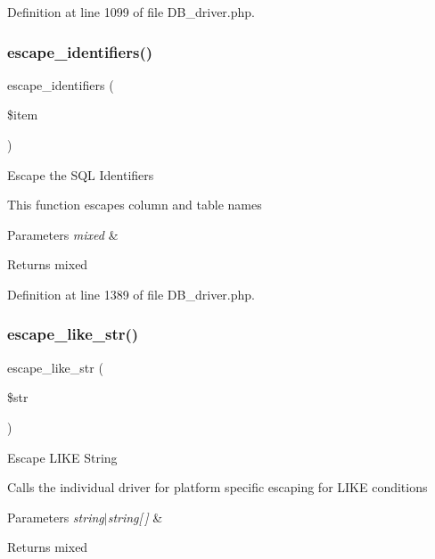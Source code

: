 Definition at line 1099 of file D\+B\+\_\+driver.\+php.

\mbox{\label{class_c_i___d_b__driver_abe5c555644f8bac97c3f84c7d2325fdc}} 
\subsubsection{\texorpdfstring{escape\_identifiers()}{escape\_identifiers()}}
{\footnotesize\ttfamily escape\+\_\+identifiers (\begin{DoxyParamCaption}\item[{}]{\$item }\end{DoxyParamCaption})}

Escape the S\+QL Identifiers

This function escapes column and table names


\begin{DoxyParams}{Parameters}
{\em mixed} & \\
\hline
\end{DoxyParams}
\begin{DoxyReturn}{Returns}
mixed 
\end{DoxyReturn}


Definition at line 1389 of file D\+B\+\_\+driver.\+php.

\mbox{\label{class_c_i___d_b__driver_a1a15f371afab8d5cfb35e38fc53c620f}} 
\subsubsection{\texorpdfstring{escape\_like\_str()}{escape\_like\_str()}}
{\footnotesize\ttfamily escape\+\_\+like\+\_\+str (\begin{DoxyParamCaption}\item[{}]{\$str }\end{DoxyParamCaption})}

Escape L\+I\+KE String

Calls the individual driver for platform specific escaping for L\+I\+KE conditions


\begin{DoxyParams}{Parameters}
{\em string$\vert$string\mbox{[}$\,$\mbox{]}} & \\
\hline
\end{DoxyParams}
\begin{DoxyReturn}{Returns}
mixed 
\end{DoxyReturn}


